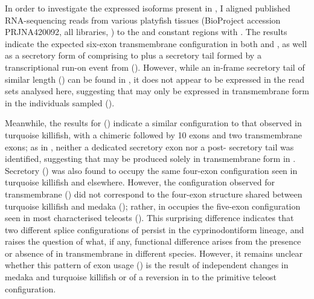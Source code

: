In order to investigate the expressed isoforms present in \Xma, I aligned published RNA-sequencing reads from various platyfish tissues (BioProject accession PRJNA420092, all libraries, ) to the  and  constant regions with . The results indicate the expected six-exon transmembrane configuration in both  and , as well as a secretory form of  comprising  to  plus a  secretory tail formed by a transcriptional run-on event from  (). However, while an in-frame secretory tail of similar length () can be found in , it does not appear to be expressed in the read sets analysed here, suggesting that  may only be expressed in transmembrane form in the individuals sampled ().

Meanwhile, the results for  () indicate a similar configuration to that observed in turquoise killifish, with a chimeric  followed by 10 \cd{} exons and two transmembrane exons; as in \Nfu, neither a dedicated  secretory exon nor a post- secretory tail was identified, suggesting that  may be produced solely in transmembrane form in \Xma. Secretory  () was also found to occupy the same four-exon configuration seen in turquoise killifish and elsewhere. However, the configuration observed for transmembrane  () did not correspond to the four-exon structure shared between turquoise killifish and medaka (); rather,  in \Xma occupies the five-exon configuration seen in most characterised teleosts (). This surprising difference indicates that two different splice configurations of  persist in the cyprinodontiform lineage, and raises the question of what, if any, functional difference arises from the presence or absence of  in transmembrane  in different species. However, it remains unclear whether this pattern of exon usage () is the result of independent changes in medaka and turquoise killifish or of a reversion in \Xma to the primitive teleost configuration.
	
